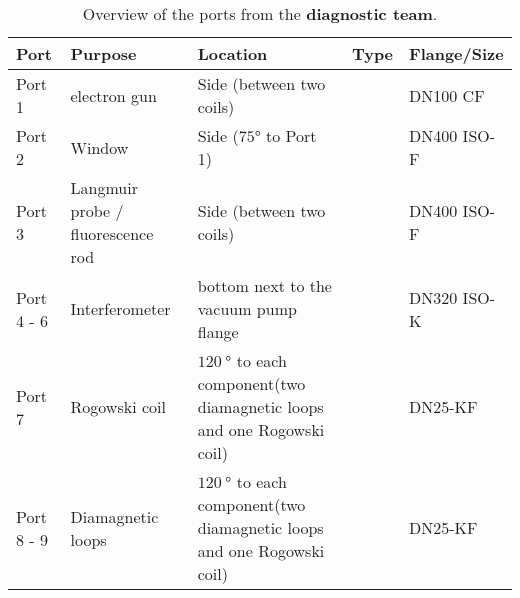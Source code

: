 \begin{table}[H]
    \centering
    \caption{Overview of the ports from the \textbf{diagnostic team}.}
    \begin{tabular}{>{\raggedright\arraybackslash}p{2cm} >{\raggedright\arraybackslash}p{3cm} >{\raggedright\arraybackslash}p{3.5cm} >{\raggedright\arraybackslash}p{3.5cm} >{\raggedright\arraybackslash}p{2cm}}
        \toprule
        \textbf{Port} & \textbf{Purpose}  & \textbf{Location}                 & \textbf{Type} & \textbf{Flange/Size}                                              \\
        \midrule
        Port 1        & electron gun   & Side (between two coils)                    &               & DN100 CF                                                                  \\
        Port 2        & Window            & Side ($75\si{\degree}$ to Port 1) &               & DN400 ISO-F                                              \\
        \midrule
        Port 3        & Langmuir probe / fluorescence rod    & Side (between two coils)                     &               & DN400 ISO-F \\
        Port 4 - 6    & Interferometer    & bottom next to the vacuum pump flange                                 &              & DN320 ISO-K                                                                 \\
        Port 7        & Rogowski coil     &$120~\si{\degree}$ to each component(two diamagnetic loops and one Rogowski coil)                                   &     & DN25-KF                                                                  \\
        Port 8 - 9    & Diamagnetic loops &$120~\si{\degree}$ to each component(two diamagnetic loops and one Rogowski coil)                                   &     &    DN25-KF                                                               \\

        \bottomrule
    \end{tabular}
\end{table}

